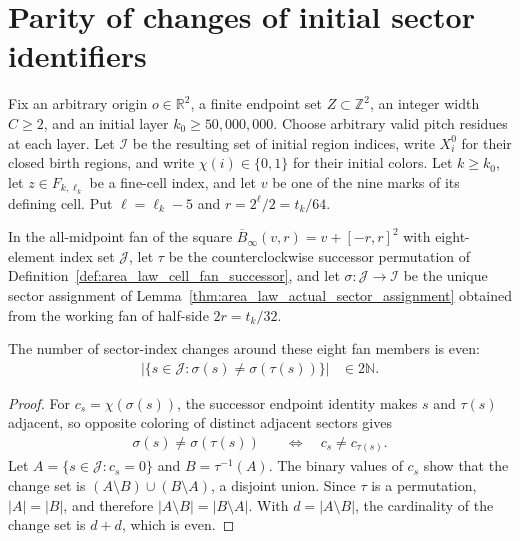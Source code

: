 \section{Parity of changes of initial sector identifiers}
\label{sec:area_law_initial_sector_cycle}

Fix an arbitrary origin $o\in\mathbb R^2$, a finite endpoint set
$Z\subset\mathbb Z^2$, an integer width $C\ge2$, and an initial layer
$k_0\ge50{,}000{,}000$. Choose arbitrary valid pitch residues at each
layer. Let $\mathcal I$ be the resulting set of initial region indices,
write $X_i^0$ for their closed birth regions, and write
$\chi(i)\in\{0,1\}$ for their initial colors.
Let $k\ge k_0$, let $z\in F_{k,\ell_k}$ be a fine-cell index,
and let $v$ be one of the nine marks of its defining cell.
Put $\ell=\ell_k-5$ and $r=2^\ell/2=t_k/64$.

In the all-midpoint fan of the square
$\overline B_\infty(v,r)=v+[-r,r]^2$ with eight-element index set
$\mathcal J$, let $\tau$ be the counterclockwise successor permutation
of Definition~\ref{def:area_law_cell_fan_successor}, and
let $\sigma:\mathcal J\to\mathcal I$ be the unique sector assignment
of Lemma~\ref{thm:area_law_actual_sector_assignment} obtained from
the working fan of half-side $2r=t_k/32$.


\begin{lemma}
    \label{thm:area_law_initial_sector_changes_even}
    \leanok
    The number of sector-index changes around these
    eight fan members is even:
    \begin{align}
        \left|\{s\in\mathcal J:
        \sigma(s)\ne\sigma(\tau(s))\}\right| & \in2\mathbb N.
    \end{align}
\end{lemma}
\begin{proof}\leanok
    For $c_s=\chi(\sigma(s))$, the successor endpoint identity makes
    $s$ and $\tau(s)$ adjacent, so opposite coloring of distinct adjacent
    sectors gives
    \begin{align}
        \sigma(s)\ne\sigma(\tau(s))
         & \quad\Longleftrightarrow\quad c_s\ne c_{\tau(s)}.
    \end{align}
    Let $A=\{s\in\mathcal J:c_s=0\}$ and $B=\tau^{-1}(A)$.
    The binary values of $c_s$ show that the change set is
    $(A\setminus B)\cup(B\setminus A)$, a disjoint union.
    Since $\tau$ is a permutation, $|A|=|B|$, and therefore
    $|A\setminus B|=|B\setminus A|$. With
    $d=|A\setminus B|$, the cardinality of the change set is $d+d$,
    which is even.
\end{proof}
